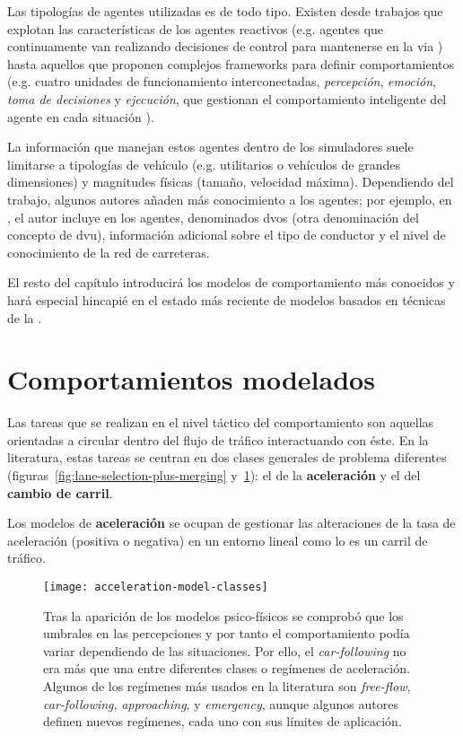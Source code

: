 Las tipologías de agentes utilizadas es de todo tipo. Existen desde trabajos que explotan las características de los agentes reactivos (e.g. agentes que continuamente van realizando decisiones de control para mantenerse en la via \cite{Ehlert2001}) hasta aquellos que proponen complejos frameworks para definir comportamientos (e.g. cuatro unidades de funcionamiento interconectadas, \textit{percepción}, \textit{emoción}, \textit{toma de decisiones} y \textit{ejecución}, que gestionan el comportamiento inteligente del agente en cada situación \cite{al2001framework}).

La información que manejan estos agentes dentro de los simuladores suele limitarse a tipologías de vehículo (e.g. utilitarios o vehículos de grandes dimensiones) y magnitudes físicas (tamaño, velocidad máxima). Dependiendo del trabajo, algunos autores añaden más conocimiento a los agentes; por ejemplo, en \cite{hidas2002}, el autor incluye en los agentes, denominados \glspl{dvo} (otra denominación del concepto de \gls{dvu}), información adicional sobre el tipo de conductor y el nivel de conocimiento de la red de carreteras.

El resto del capítulo introducirá los modelos de comportamiento más conocidos y hará especial hincapié en el estado más reciente de modelos basados en técnicas de la .

\section{Comportamientos modelados}

Las tareas que se realizan en el nivel táctico del comportamiento son aquellas orientadas a circular dentro del flujo de tráfico interactuando con éste. En la literatura, estas tareas se centran en dos clases generales de problema diferentes (figuras~\ref{fig:lane-selection-plus-merging} y~\ref{fig:acceleration-model-classes}): el de la \textbf{aceleración} y el del \textbf{cambio de carril}.

Los modelos de \textbf{aceleración} se ocupan de gestionar las alteraciones de la tasa de aceleración (positiva o negativa) en un entorno lineal como lo es un carril de tráfico.

\begin{figure}[t]
	\centering
	\texttt{[image: acceleration-model-classes]}
	\caption[Diferentes modelos de aceleración]{Tras la aparición de los modelos psico-físicos se comprobó que los umbrales en las percepciones y por tanto el comportamiento podía variar dependiendo de las situaciones. Por ello, el \textit{car-following} no era más que una entre diferentes clases o regímenes de aceleración. Algunos de los regímenes más usados en la literatura son \textit{free-flow}, \textit{car-following}, \textit{approaching}, y \textit{emergency}, aunque algunos autores definen nuevos regímenes, cada uno con sus límites de aplicación.}
	\label{fig:acceleration-model-classes}
\end{figure}

